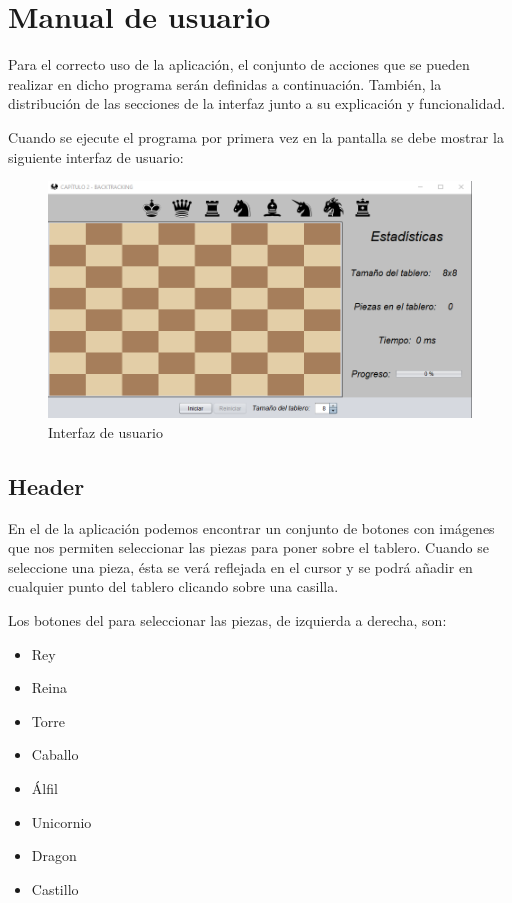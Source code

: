 \section{Manual de usuario}\label{Manual usuario}

Para el correcto uso de la aplicación, el conjunto de acciones que se pueden realizar en dicho programa serán definidas a continuación. También, la distribución de las secciones de la interfaz junto a su explicación y funcionalidad.\bigskip

Cuando se ejecute el programa por primera vez en la pantalla se debe mostrar la siguiente interfaz de usuario:

\begin{figure}[!h]
    \centering
    \includegraphics[width=\linewidth]{Usage/img/GUI.png}
    \caption{Interfaz de usuario}
    \label{fig:User_interface}
\end{figure}

\subsection{Header}\label{Manual usuario, Header}
En el  de la aplicación podemos encontrar un conjunto de botones con imágenes que nos permiten seleccionar las piezas para poner sobre el tablero. Cuando se seleccione una pieza, ésta se verá reflejada en el cursor y se podrá añadir en cualquier punto del tablero clicando sobre una casilla. \bigskip

Los botones del  para seleccionar las piezas, de izquierda a derecha, son: 

\begin{multicols}{2}
\begin{itemize}
    \item[] Rey
    \item[] Reina
    \item[] Torre
    \item[] Caballo
    \item[] Álfil
    \item[] Unicornio
    \item[] Dragon
    \item[] Castillo
\end{itemize}
\end{multicols}

